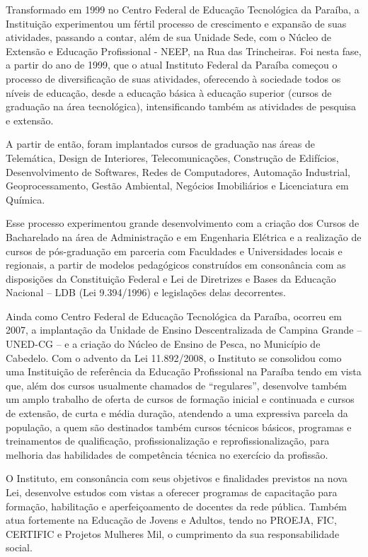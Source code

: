 	Transformado em 1999 no Centro Federal de Educação Tecnológica da Paraíba, a Instituição experimentou um fértil processo de crescimento e expansão de suas atividades, passando a contar, além de sua Unidade Sede, com o Núcleo de Extensão e Educação Profissional - NEEP, na Rua das Trincheiras. Foi nesta fase, a partir do ano de 1999, que o atual Instituto Federal da Paraíba começou o processo de diversificação de suas atividades, oferecendo à sociedade todos os níveis de educação, desde a educação básica à educação superior (cursos de graduação na área tecnológica), intensificando também as atividades de pesquisa e extensão. 
	
	A partir de então, foram implantados cursos de graduação nas áreas de Telemática, Design de Interiores, Telecomunicações, Construção de Edifícios, Desenvolvimento de Softwares, Redes de Computadores, Automação Industrial, Geoprocessamento, Gestão Ambiental, Negócios Imobiliários e Licenciatura em Química. 
	
	Esse processo experimentou grande desenvolvimento com a criação dos Cursos de Bacharelado na área de Administração e em Engenharia Elétrica e a realização de cursos de pós-graduação em parceria com Faculdades e Universidades locais e regionais, a partir de modelos pedagógicos construídos em consonância com as disposições da Constituição Federal e Lei de Diretrizes e Bases da Educação Nacional – LDB (Lei 9.394/1996) e legislações delas decorrentes.
	
	Ainda como Centro Federal de Educação Tecnológica da Paraíba, ocorreu em 2007, a implantação da Unidade de Ensino Descentralizada de Campina Grande – UNED-CG – e a criação do Núcleo de Ensino de Pesca, no Município de Cabedelo. Com o advento da Lei 11.892/2008, o Instituto se consolidou como uma Instituição de referência da Educação Profissional na Paraíba tendo em vista que, além dos cursos usualmente chamados de “regulares”, desenvolve também um amplo trabalho de oferta de cursos de formação inicial e continuada e cursos de extensão, de curta e média duração, atendendo a uma expressiva parcela da população, a quem são destinados também cursos técnicos básicos, programas e treinamentos de qualificação, profissionalização e reprofissionalização, para melhoria das habilidades de competência técnica no exercício da profissão.
	
	O Instituto, em consonância com seus objetivos e finalidades previstos na nova Lei, desenvolve estudos com vistas a oferecer programas de capacitação para formação, habilitação e aperfeiçoamento de docentes da rede pública. Também atua fortemente na Educação de Jovens e Adultos, tendo no PROEJA, FIC, CERTIFIC e Projetos Mulheres Mil, o cumprimento da sua responsabilidade social.
	
